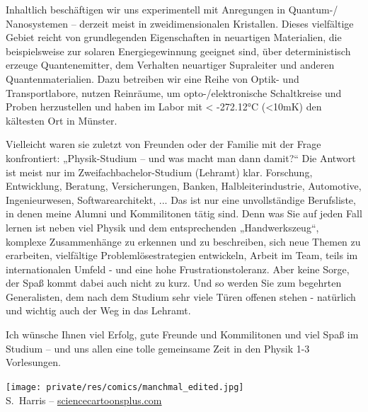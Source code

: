 \begin{multicols}{2}
Inhaltlich beschäftigen wir uns experimentell mit Anregungen in Quantum-/ Nanosystemen – derzeit meist in zweidimensionalen Kristallen. Dieses vielfältige Gebiet reicht von grundlegenden Eigenschaften in neuartigen Materialien, die beispielsweise zur solaren Energiegewinnung geeignet sind, über deterministisch erzeuge Quantenemitter, dem Verhalten neuartiger Supraleiter und anderen Quantenmaterialien. Dazu betreiben wir eine Reihe von Optik- und Transportlabore, nutzen Reinräume, um opto-/elektronische Schaltkreise und Proben herzustellen und haben im Labor mit < -272.12°C (<10mK) den kältesten Ort in Münster. 

Vielleicht waren sie zuletzt von Freunden oder der Familie mit der Frage konfrontiert: „Physik-Studium – und was macht man dann damit?“ Die Antwort ist meist nur im Zweifachbachelor-Studium (Lehramt) klar. Forschung, Entwicklung, Beratung, Versicherungen, Banken, Halbleiterindustrie, Automotive, Ingenieurwesen, Softwarearchitekt, ... Das ist nur eine unvollständige Berufsliste, in denen meine Alumni und Kommilitonen tätig sind. Denn was Sie auf jeden Fall lernen ist neben viel Physik und dem entsprechenden „Handwerkszeug“, komplexe Zusammenhänge zu erkennen und zu beschreiben, sich neue Themen zu erarbeiten, vielfältige Problemlösestrategien entwickeln, Arbeit im Team, teils im internationalen Umfeld - und eine hohe Frustrationstoleranz. Aber keine Sorge, der Spaß kommt dabei auch nicht zu kurz. Und so werden Sie zum begehrten Generalisten, dem nach dem Studium sehr viele Türen offenen stehen - natürlich und wichtig auch der Weg in das Lehramt.

Ich wünsche Ihnen viel Erfolg, gute Freunde und Kommilitonen und viel Spaß im Studium – und uns allen eine tolle gemeinsame Zeit in den Physik 1-3 Vorlesungen. 

\begin{center}
\texttt{[image: private/res/comics/manchmal\_edited.jpg]}\\
{\footnotesize 
S.~Harris – \url{sciencecartoonsplus.com}
}
\end{center}

\end{multicols}

\vfill

\newpage

